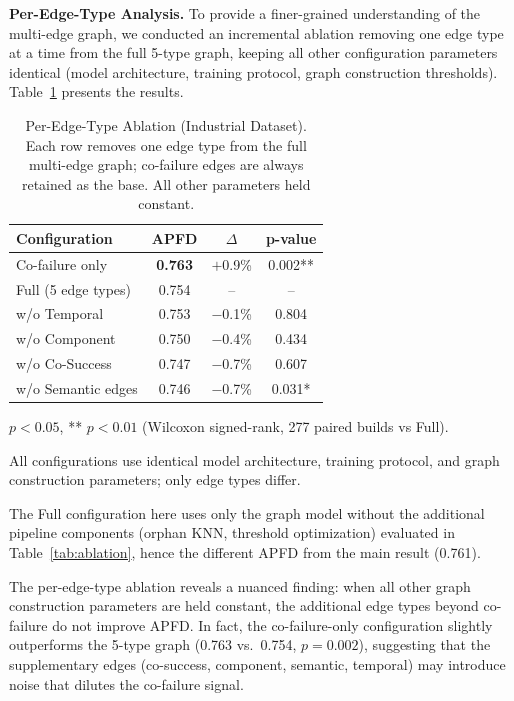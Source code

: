 \textbf{Per-Edge-Type Analysis.} To provide a finer-grained understanding
of the multi-edge graph, we conducted an incremental ablation removing one
edge type at a time from the full 5-type graph, keeping all other
configuration parameters identical (model architecture, training protocol,
graph construction thresholds).
Table~\ref{tab:edge_ablation} presents the results.

\begin{table}[!t]
\centering
\caption{Per-Edge-Type Ablation (Industrial Dataset). Each row removes one
edge type from the full multi-edge graph; co-failure edges are always
retained as the base. All other parameters held constant.}
\label{tab:edge_ablation}
\footnotesize
\begin{tabular}{lccc}
\toprule
\textbf{Configuration} & \textbf{APFD} & \textbf{$\Delta$} & \textbf{p-value} \\
\midrule
Co-failure only & \textbf{0.763} & $+$0.9\% & 0.002** \\
Full (5 edge types) & 0.754 & -- & -- \\
w/o Temporal & 0.753 & $-$0.1\% & 0.804 \\
w/o Component & 0.750 & $-$0.4\% & 0.434 \\
w/o Co-Success & 0.747 & $-$0.7\% & 0.607 \\
w/o Semantic edges & 0.746 & $-$0.7\% & 0.031* \\
\bottomrule
\end{tabular}
\begin{tablenotes}
\small
\item * $p < 0.05$, ** $p < 0.01$ (Wilcoxon signed-rank, 277 paired builds vs Full).
\item All configurations use identical model architecture, training protocol,
and graph construction parameters; only edge types differ.
\item The Full configuration here uses only the graph model without the
additional pipeline components (orphan KNN, threshold optimization)
evaluated in Table~\ref{tab:ablation}, hence the different APFD from the
main result (0.761).
\end{tablenotes}
\end{table}

The per-edge-type ablation reveals a nuanced finding: when all other
graph construction parameters are held constant, the additional edge types
beyond co-failure do not improve APFD. In fact, the co-failure-only
configuration slightly outperforms the 5-type graph (0.763 vs.\
0.754, $p = 0.002$), suggesting that the supplementary edges (co-success,
component, semantic, temporal) may introduce noise that dilutes the
co-failure signal.

